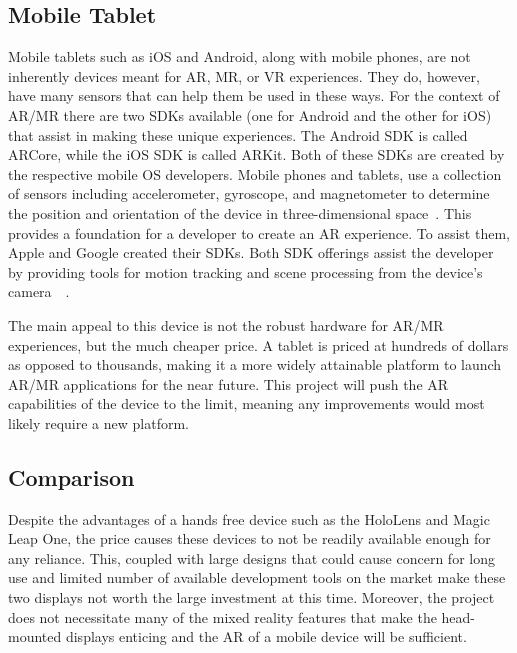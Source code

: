 \documentclass[10pt,draftclsnofoot,onecolumn,letterpaper]{IEEEtran}
\begin{document}
\subsection{Mobile Tablet}
Mobile tablets such as iOS and Android, along with mobile phones, are not inherently devices meant for AR, MR, or VR experiences. They do, however, have many sensors that can help them be used in these ways. For the context of AR/MR there are two SDKs available (one for Android and the other for iOS) that assist in making these unique experiences. The Android SDK is called ARCore, while the iOS SDK is called ARKit. Both of these SDKs are created by the respective mobile OS developers. Mobile phones and tablets, use a collection of sensors including accelerometer, gyroscope, and magnetometer to determine the position and orientation of the device in three-dimensional space~\cite{PhoneSense}. This provides a foundation for a developer to create an AR experience. To assist them, Apple and Google created their SDKs. Both SDK offerings assist the developer by providing tools for motion tracking and scene processing from the device's camera~\cite{ARKdoc}~\cite{ARCdoc}.\par
The main appeal to this device is not the robust hardware for AR/MR experiences, but the much cheaper price. A tablet is priced at hundreds of dollars as opposed to thousands, making it a more widely attainable platform to launch AR/MR applications for the near future. This project will push the AR capabilities of the device to the limit, meaning any improvements would most likely require a new platform.\par

\subsection{Comparison}

Despite the advantages of a hands free device such as the HoloLens and Magic Leap One, the price causes these devices to not be readily available enough for any reliance. This, coupled with large designs that could cause concern for long use and limited number of available development tools on the market make these two displays not worth the large investment at this time. Moreover, the project does not necessitate many of the mixed reality features that make the head-mounted displays enticing and the AR of a mobile device will be sufficient.\par
\end{document}
